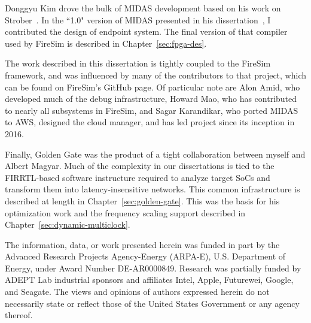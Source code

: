 Donggyu Kim drove the bulk of MIDAS development based on his work on
Strober~\cite{Strober}. In the ``1.0" version of MIDAS presented in his
dissertation~\cite{DGKDissertation}, I contributed the design of endpoint
system. The final version of that compiler used by FireSim is described in
Chapter~\ref{sec:fpga-des}.

The work described in this dissertation is tightly coupled to the FireSim
framework, and was influenced by many of the contributors to that project,
which can be found on FireSim's GitHub page. Of particular note are Alon Amid,
who developed much of the debug infrastructure, Howard Mao, who has contributed
to nearly all subsystems in FireSim, and Sagar Karandikar, who ported MIDAS to
AWS, designed the cloud manager, and has led project since its inception in 2016.

Finally, Golden Gate was the product of a tight collaboration
between myself and Albert Magyar. Much of the complexity in our dissertations
is tied to the FIRRTL-based software instructure required to analyze target
SoCs and transform them into latency-insensitive networks. This common
infrastructure is described at length in Chapter~\ref{sec:golden-gate}. This
was the basis for his optimization work and the frequency scaling support
described in Chapter~\ref{sec:dynamic-multiclock}.

The information, data, or work presented herein was funded in part by the
Advanced Research Projects Agency-Energy (ARPA-E), U.S. Department of Energy,
under Award Number DE-AR0000849.  Research was partially funded by ADEPT Lab
industrial sponsors and affiliates Intel, Apple, Futurewei, Google, and
Seagate.  The views and opinions of authors expressed herein do not necessarily
state or reflect those of the United States Government or any agency thereof.

